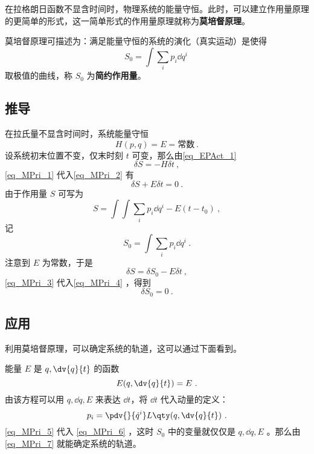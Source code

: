 在拉格朗日函数不显含时间时，物理系统的能量守恒。此时，可以建立作用量原理的更简单的形式，这一简单形式的作用量原理就称为\textbf{莫培督原理}。

莫培督原理可描述为：满足能量守恒的系统的演化（真实运动）是使得
\begin{equation}
S_0=\int\sum_i p_i\dd q^i~
\end{equation}
取极值的曲线，称 $S_0$ 为\textbf{简约作用量}。
\subsection{推导}
在拉氏量不显含时间时，系统能量守恒
\begin{equation}\label{eq_MPri_1}
H(p,q)=E=\text{常数}~.
\end{equation}
设系统初末位置不变，仅末时刻 $t$ 可变，那么由\autoref{eq_EPAct_1}~
\begin{equation}\label{eq_MPri_2}
\delta S=-H\delta t~,
\end{equation}
\autoref{eq_MPri_1} 代入\autoref{eq_MPri_2} 有
\begin{equation}\label{eq_MPri_4}
\delta S+E\delta t=0~.
\end{equation}
由于作用量 $S$ 可写为
\begin{equation}
S=\int \int\sum_i p_i\dd q^i-E(t-t_0)~,
\end{equation}
记
\begin{equation}\label{eq_MPri_6}
S_0=\int\sum_i p_i\dd q^i~.
\end{equation}
注意到 $E$ 为常数，于是
\begin{equation}\label{eq_MPri_3}
\delta S=\delta S_0-E\delta t~,
\end{equation}
\autoref{eq_MPri_3} 代入\autoref{eq_MPri_4} ，得到
\begin{equation}\label{eq_MPri_7}
\delta S_0=0~.
\end{equation}
\subsection{应用}
利用莫培督原理，可以确定系统的轨道，这可以通过下面看到。

能量 $E$ 是 $q,\dv{q}{t}$ 的函数 
\begin{equation}
E(q,\dv{q}{t})=E~.
\end{equation}
由该方程可以用 $q,\dd q,E$ 来表达 $\dd t$，将 $\dd t$ 代入动量的定义：
\begin{equation}\label{eq_MPri_5}
p_i=\pdv{}{\dot q^i}L\qty(q,\dv{q}{t})~.
\end{equation}
\autoref{eq_MPri_5} 代入 \autoref{eq_MPri_6} ，这时 $S_0$ 中的变量就仅仅是 $q,\dd q, E$ 。那么由\autoref{eq_MPri_7} 就能确定系统的轨道。

